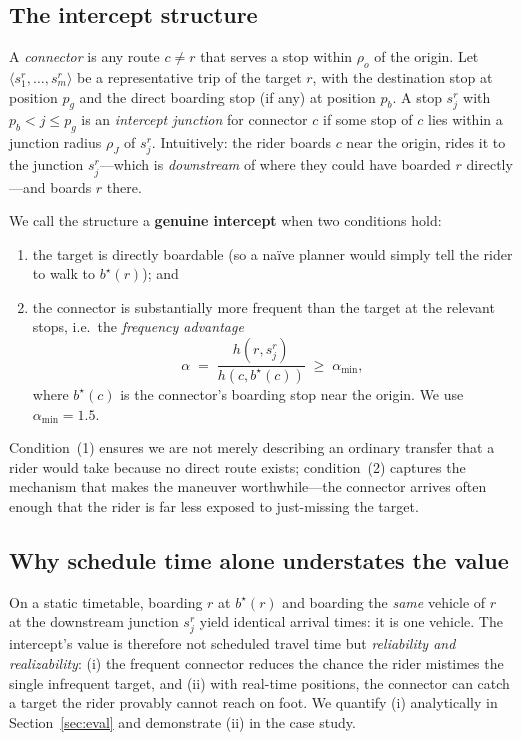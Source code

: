 \documentclass[conference]{IEEEtran}
\begin{document}
\subsection{The intercept structure}
A \emph{connector} is any route $c \neq r$ that serves a stop within $\rho_o$ of
the origin. Let $\langle s_1^r,\dots,s_m^r\rangle$ be a representative trip of the
target $r$, with the destination stop at position $p_g$ and the direct boarding
stop (if any) at position $p_b$. A stop $s_j^r$ with $p_b < j \le p_g$ is an
\emph{intercept junction} for connector $c$ if some stop of $c$ lies within a
junction radius $\rho_J$ of $s_j^r$. Intuitively: the rider boards $c$ near the
origin, rides it to the junction $s_j^r$---which is \emph{downstream} of where
they could have boarded $r$ directly---and boards $r$ there.

We call the structure a \textbf{genuine intercept} when two conditions hold:
\begin{enumerate}
  \item the target is directly boardable (so a na\"ive planner would simply tell
  the rider to walk to $b^\star(r)$); and
  \item the connector is substantially more frequent than the target at the
  relevant stops, i.e.\ the \emph{frequency advantage}
  \begin{equation}
    \alpha \;=\; \frac{h(r, s_j^r)}{h(c, b^\star(c))} \;\ge\; \alpha_{\min},
    \label{eq:adv}
  \end{equation}
  where $b^\star(c)$ is the connector's boarding stop near the origin. We use
  $\alpha_{\min}=1.5$.
\end{enumerate}
Condition~(1) ensures we are not merely describing an ordinary transfer that a
rider would take because no direct route exists; condition~(2) captures the
mechanism that makes the maneuver worthwhile---the connector arrives often enough
that the rider is far less exposed to just-missing the target.

\subsection{Why schedule time alone understates the value}
On a static timetable, boarding $r$ at $b^\star(r)$ and boarding the \emph{same}
vehicle of $r$ at the downstream junction $s_j^r$ yield identical arrival times:
it is one vehicle. The intercept's value is therefore not scheduled travel time
but \emph{reliability and realizability}: (i) the frequent connector reduces the
chance the rider mistimes the single infrequent target, and (ii) with real-time
positions, the connector can catch a target the rider provably cannot reach on
foot. We quantify (i) analytically in Section~\ref{sec:eval} and demonstrate (ii)
in the case study.
\end{document}
